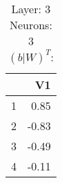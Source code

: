 \begin{table}[ht]
\centering
\begin{tabular}{rr}
  \hline
 & V1 \\ 
  \hline
1 & 0.85 \\ 
  2 & -0.83 \\ 
  3 & -0.49 \\ 
  4 & -0.11 \\ 
   \hline
\end{tabular}
\caption{Layer: 3 Neurons: 3  $(b|W)^T$: 
} 
\end{table}

